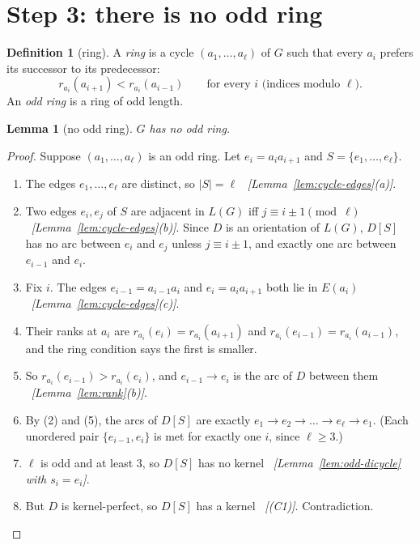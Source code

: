 \documentclass[11pt]{article}
\theoremstyle{plain}
\newtheorem{lemma}[theorem]{Lemma}
\theoremstyle{definition}
\newtheorem{definition}[theorem]{Definition}
\theoremstyle{remark}
\newcommand{\LG}{L(G)}
\newcommand{\st}[1]{E(#1)}
\newcommand{\why}[1]{\unskip\ \textit{[#1]}}
\newenvironment{steps}{\begin{enumerate}[label=(\arabic*),leftmargin=2.2em,itemsep=0.35em]}{\end{enumerate}}
\begin{document}
\section{Step 3: there is no odd ring}\label{sec:step3}

\begin{definition}[ring]\label{def:ring}
A \emph{ring} is a cycle $(a_1,\dots,a_\ell)$ of $G$ such that every $a_i$ prefers its successor
to its predecessor:
\[
  r_{a_i}(a_{i+1})<r_{a_i}(a_{i-1})\qquad\text{for every } i \text{ (indices modulo }\ell).
\]
An \emph{odd ring} is a ring of odd length.
\end{definition}

\begin{lemma}[no odd ring]\label{lem:no-odd-ring}
$G$ has no odd ring.
\end{lemma}

\begin{proof}
Suppose $(a_1,\dots,a_\ell)$ is an odd ring. Let $e_i=a_ia_{i+1}$ and $S=\{e_1,\dots,e_\ell\}$.
\begin{steps}
  \item The edges $e_1,\dots,e_\ell$ are distinct, so $|S|=\ell$
    \why{Lemma~\ref{lem:cycle-edges}(a)}.
  \item Two edges $e_i,e_j$ of $S$ are adjacent in $\LG$ iff $j\equiv i\pm 1\pmod\ell$
    \why{Lemma~\ref{lem:cycle-edges}(b)}. Since $D$ is an orientation of $\LG$, $D[S]$ has no arc
    between $e_i$ and $e_j$ unless $j\equiv i\pm 1$, and exactly one arc between $e_{i-1}$ and
    $e_i$.
  \item Fix $i$. The edges $e_{i-1}=a_{i-1}a_i$ and $e_i=a_ia_{i+1}$ both lie in $\st{a_i}$
    \why{Lemma~\ref{lem:cycle-edges}(c)}.
  \item Their ranks at $a_i$ are $r_{a_i}(e_i)=r_{a_i}(a_{i+1})$ and
    $r_{a_i}(e_{i-1})=r_{a_i}(a_{i-1})$, and the ring condition says the first is smaller.
  \item So $r_{a_i}(e_{i-1})>r_{a_i}(e_i)$, and $e_{i-1}\to e_i$ is the arc of $D$ between them
    \why{Lemma~\ref{lem:rank}(b)}.
  \item By (2) and (5), the arcs of $D[S]$ are exactly $e_1\to e_2\to\dots\to e_\ell\to e_1$.
    (Each unordered pair $\{e_{i-1},e_i\}$ is met for exactly one $i$, since $\ell\ge 3$.)
  \item $\ell$ is odd and at least $3$, so $D[S]$ has no kernel
    \why{Lemma~\ref{lem:odd-dicycle} with $s_i=e_i$}.
  \item But $D$ is kernel-perfect, so $D[S]$ has a kernel \why{(C1)}. Contradiction. \qedhere
\end{steps}
\end{proof}
\end{document}
